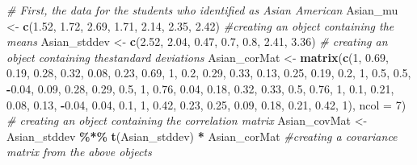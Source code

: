 \documentclass[
  11pt,
]{book}
\newenvironment{Shaded}{\begin{snugshade}}{\end{snugshade}}
\newcommand{\AttributeTok}[1]{\textcolor[rgb]{0.27,0.27,0.27}{#1}}
\newcommand{\CommentTok}[1]{\textcolor[rgb]{0.37,0.37,0.37}{\textit{#1}}}
\newcommand{\DecValTok}[1]{\textcolor[rgb]{0.06,0.06,0.06}{#1}}
\newcommand{\FloatTok}[1]{\textcolor[rgb]{0.06,0.06,0.06}{#1}}
\newcommand{\FunctionTok}[1]{\textcolor[rgb]{0.27,0.27,0.27}{\textbf{#1}}}
\newcommand{\NormalTok}[1]{#1}
\newcommand{\OtherTok}[1]{\textcolor[rgb]{0.37,0.37,0.37}{#1}}
\newcommand{\SpecialCharTok}[1]{\textcolor[rgb]{0.43,0.43,0.43}{\textbf{#1}}}
\begin{document}
\begin{Shaded}
\begin{Highlighting}[]
\CommentTok{\# First, the data for the students who identified as Asian American}
\NormalTok{Asian\_mu }\OtherTok{\textless{}{-}} \FunctionTok{c}\NormalTok{(}\FloatTok{1.52}\NormalTok{, }\FloatTok{1.72}\NormalTok{, }\FloatTok{2.69}\NormalTok{, }\FloatTok{1.71}\NormalTok{, }\FloatTok{2.14}\NormalTok{, }\FloatTok{2.35}\NormalTok{, }\FloatTok{2.42}\NormalTok{)  }\CommentTok{\#creating an object containing the means}
\NormalTok{Asian\_stddev }\OtherTok{\textless{}{-}} \FunctionTok{c}\NormalTok{(}\FloatTok{2.52}\NormalTok{, }\FloatTok{2.04}\NormalTok{, }\FloatTok{0.47}\NormalTok{, }\FloatTok{0.7}\NormalTok{, }\FloatTok{0.8}\NormalTok{, }\FloatTok{2.41}\NormalTok{, }\FloatTok{3.36}\NormalTok{)  }\CommentTok{\# creating an object containing thestandard deviations}
\NormalTok{Asian\_corMat }\OtherTok{\textless{}{-}} \FunctionTok{matrix}\NormalTok{(}\FunctionTok{c}\NormalTok{(}\DecValTok{1}\NormalTok{, }\FloatTok{0.69}\NormalTok{, }\FloatTok{0.19}\NormalTok{, }\FloatTok{0.28}\NormalTok{, }\FloatTok{0.32}\NormalTok{, }\FloatTok{0.08}\NormalTok{, }\FloatTok{0.23}\NormalTok{, }\FloatTok{0.69}\NormalTok{, }\DecValTok{1}\NormalTok{,}
    \FloatTok{0.2}\NormalTok{, }\FloatTok{0.29}\NormalTok{, }\FloatTok{0.33}\NormalTok{, }\FloatTok{0.13}\NormalTok{, }\FloatTok{0.25}\NormalTok{, }\FloatTok{0.19}\NormalTok{, }\FloatTok{0.2}\NormalTok{, }\DecValTok{1}\NormalTok{, }\FloatTok{0.5}\NormalTok{, }\FloatTok{0.5}\NormalTok{, }\SpecialCharTok{{-}}\FloatTok{0.04}\NormalTok{, }\FloatTok{0.09}\NormalTok{, }\FloatTok{0.28}\NormalTok{,}
    \FloatTok{0.29}\NormalTok{, }\FloatTok{0.5}\NormalTok{, }\DecValTok{1}\NormalTok{, }\FloatTok{0.76}\NormalTok{, }\FloatTok{0.04}\NormalTok{, }\FloatTok{0.18}\NormalTok{, }\FloatTok{0.32}\NormalTok{, }\FloatTok{0.33}\NormalTok{, }\FloatTok{0.5}\NormalTok{, }\FloatTok{0.76}\NormalTok{, }\DecValTok{1}\NormalTok{, }\FloatTok{0.1}\NormalTok{, }\FloatTok{0.21}\NormalTok{,}
    \FloatTok{0.08}\NormalTok{, }\FloatTok{0.13}\NormalTok{, }\SpecialCharTok{{-}}\FloatTok{0.04}\NormalTok{, }\FloatTok{0.04}\NormalTok{, }\FloatTok{0.1}\NormalTok{, }\DecValTok{1}\NormalTok{, }\FloatTok{0.42}\NormalTok{, }\FloatTok{0.23}\NormalTok{, }\FloatTok{0.25}\NormalTok{, }\FloatTok{0.09}\NormalTok{, }\FloatTok{0.18}\NormalTok{, }\FloatTok{0.21}\NormalTok{,}
    \FloatTok{0.42}\NormalTok{, }\DecValTok{1}\NormalTok{), }\AttributeTok{ncol =} \DecValTok{7}\NormalTok{)  }\CommentTok{\# creating an object containing the correlation matrix}
\NormalTok{Asian\_covMat }\OtherTok{\textless{}{-}}\NormalTok{ Asian\_stddev }\SpecialCharTok{\%*\%} \FunctionTok{t}\NormalTok{(Asian\_stddev) }\SpecialCharTok{*}\NormalTok{ Asian\_corMat  }\CommentTok{\#creating a covariance matrix from the above objects}


\end{Highlighting}
\end{Shaded}
\end{document}
